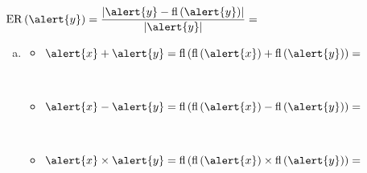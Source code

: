 \begin{frame}
\begin{solution}
\begin{enumerate}[a)]
\begin{multicols}{2}
\begin{itemize}
					            \begin{math}
						            \operatorname{ER}\left(\alert{y}\right)=
						            \dfrac{
							            \left|
							            \alert{y}-
							            \operatorname{fl}\left(\alert{y}\right)
							            \right|}{
							            \left|
							            \alert{y}
							            \right|}=
					            \end{math}
				      \end{itemize}
			      \end{multicols}
		\end{enumerate}
	\end{solution}
\end{frame}

\begin{frame}

	\begin{solution}
		\begin{enumerate}[c)]

			\item

			      \begin{multicols}{2}
				      \begin{itemize}
					      \item

					            \begin{math}
						            \alert{x}+\alert{y}=
						            \operatorname{fl}
						            \left(
						            \operatorname{fl}\left(\alert{x}\right)+
						            \operatorname{fl}\left(\alert{y}\right)
						            \right)=
					            \end{math}

					            \

					      \item

					            \begin{math}
						            \alert{x}-\alert{y}=
						            \operatorname{fl}
						            \left(
						            \operatorname{fl}\left(\alert{x}\right)-
						            \operatorname{fl}\left(\alert{y}\right)
						            \right)=
					            \end{math}

					            \

					      \item

					            \begin{math}
						            \alert{x}\times\alert{y}=
						            \operatorname{fl}
						            \left(
						            \operatorname{fl}\left(\alert{x}\right)\times
						            \operatorname{fl}\left(\alert{y}\right)
						            \right)=
					            \end{math}


\end{itemize}
\end{multicols}
\end{enumerate}
\end{solution}
\end{frame}
